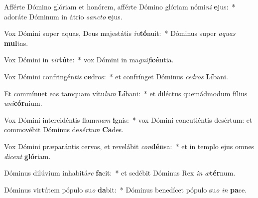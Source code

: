 \item Afférte Dómino glóriam et honórem, afférte Dómino glóriam nómi\textit{ni} \textbf{e}jus:~* adoráte Dóminum in átrio \textit{sanc}\textit{to} \textbf{e}jus.
\item Vox Dómini super aquas, Deus majestátis \textit{in}\textbf{tó}nuit:~* Dóminus super \textit{a}\textit{quas} \textbf{mul}tas.
\item Vox Dómini in \textit{vir}\textbf{tú}te:~* vox Dómini in ma\textit{gni}\textit{fi}\textbf{cén}tia.
\item Vox Dómini confringén\textit{tis} \textbf{ce}dros:~* et confrínget Dóminus \textit{ce}\textit{dros} \textbf{Lí}bani.
\item Et commínuet eas tamquam vítu\textit{lum} \textbf{Lí}bani:~* et diléctus quemádmodum fílius \textit{u}\textit{ni}\textbf{cór}nium.
\item Vox Dómini intercidéntis flam\textit{mam} \textbf{i}gnis:~* vox Dómini concutiéntis desértum: et commovébit Dóminus de\textit{sér}\textit{tum} \textbf{Ca}des.
\item Vox Dómini præparántis cervos, et revelábit \textit{con}\textbf{dén}sa:~* et in templo ejus omnes \textit{di}\textit{cent} \textbf{gló}riam.
\item Dóminus dilúvium inhabitá\textit{re} \textbf{fa}cit:~* et sedébit Dóminus Rex \textit{in} \textit{æ}\textbf{tér}num.
\item Dóminus virtútem pópulo su\textit{o} \textbf{da}bit:~* Dóminus benedícet pópulo su\textit{o} \textit{in} \textbf{pa}ce.
